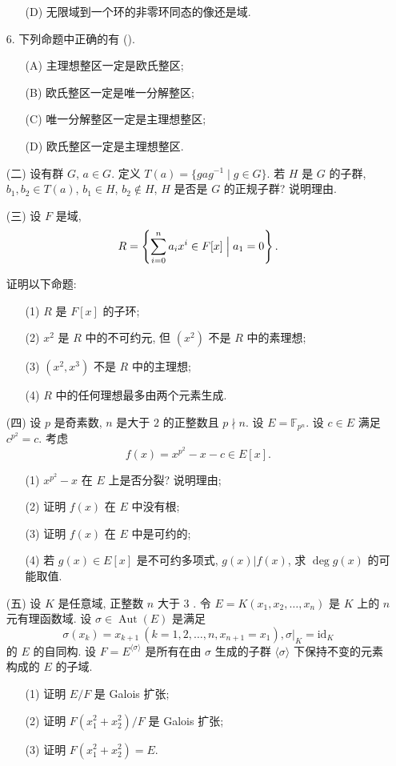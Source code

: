 \begin{itemize}
\begin{itemize}
        \item[(D)] 无限域到一个环的非零环同态的像还是域.
    \end{itemize}
    \item[6.] 下列命题中正确的有 ().
    \begin{itemize}
        \item[(A)] 主理想整区一定是欧氏整区;
        \item[(B)] 欧氏整区一定是唯一分解整区;
        \item[(C)] 唯一分解整区一定是主理想整区;
        \item[(D)] 欧氏整区一定是主理想整区.
    \end{itemize}
\item[(二)] 设有群 $G$, $a \in G$. 定义 $T(a) = \{ gag^{-1} \mid g \in G \}$.
若 $H$ 是 $G$ 的子群, $b_1, b_2 \in T(a)$, $b_1 \in H$, $b_2 \notin H$, $H$ 是否是 $G$ 的正规子群? 说明理由.
\item[(三)] 设 $F$ 是域, \[
    R = \left\{ \sum_{i=0}^n a_i x^i \in F[x]\Bigm| a_1 = 0 \right\}.
\]

证明以下命题:
\begin{itemize}
    \item[(1)] $R$ 是 $F[x]$ 的子环;
    \item[(2)] $x^2$ 是 $R$ 中的不可约元, 但 $(x^2)$ 不是 $R$ 中的素理想;
    \item[(3)] $(x^2, x^3)$ 不是 $R$ 中的主理想;
    \item[(4)] $R$ 中的任何理想最多由两个元素生成.
\end{itemize}

\item[(四)] 设 $p$ 是奇素数, $n$ 是大于 $2$ 的正整数且 $p \nmid n$.
设 $E = \mathbb{F}_{p^n}$. 设 $c \in E$ 满足 $c^{p^2} = c$. 考虑 \[
    f(x) = x^{p^2} - x - c \in E[x].
\]
\begin{itemize}
    \item[(1)] $x^{p^2} - x$ 在 $E$ 上是否分裂? 说明理由;
    \item[(2)] 证明 $f(x)$ 在 $E$ 中没有根;
    \item[(3)] 证明 $f(x)$ 在 $E$ 中是可约的;
    \item[(4)] 若 $g(x) \in E[x]$ 是不可约多项式, $g(x) | f(x)$, 求 $\deg g(x)$ 的可能取值.
\end{itemize}

\item[(五)]
设 $K$ 是任意域, 正整数 $n$ 大于 $3$ . 令 $E = K(x_1, x_2, \dots, x_n)$ 是 $K$ 上的 $n$ 元有理函数域.
设 $\sigma \in \operatorname{Aut}(E)$ 是满足 \[
    \sigma(x_k) = x_{k+1}\ (k = 1, 2, \dots, n, x_{n+1} = x_1), \sigma|_K = \mathrm{id}_K
\]
的 $E$ 的自同构. 设 $F = E^{\langle \sigma \rangle}$ 是所有在由 $\sigma$ 生成的子群 $\langle \sigma \rangle$ 下保持不变的元素构成的 $E$ 的子域.
\begin{itemize}
    \item[(1)] 证明 $E/F$ 是 Galois 扩张;
    \item[(2)] 证明 $F(x_1^2 + x_2^2) / F$ 是 Galois 扩张;
    \item[(3)] 证明 $F(x_1^2 + x_2^2) = E$.
\end{itemize}
\end{itemize}

